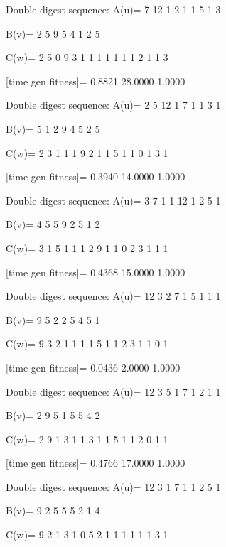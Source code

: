 Double digest sequence:
A(u)=
     7    12     1     2     1     1     5     1     3

B(v)=
     2     5     9     5     4     1     2     5

C(w)=
     2     5     0     9     3     1     1     1     1     1     1     1     2     1     1     3

[time gen fitness]=
    0.8821   28.0000    1.0000

Double digest sequence:
A(u)=
     2     5    12     1     7     1     1     3     1

B(v)=
     5     1     2     9     4     5     2     5

C(w)=
     2     3     1     1     1     9     2     1     1     5     1     1     0     1     3     1

[time gen fitness]=
    0.3940   14.0000    1.0000

Double digest sequence:
A(u)=
     3     7     1     1    12     1     2     5     1

B(v)=
     4     5     5     9     2     5     1     2

C(w)=
     3     1     5     1     1     1     2     9     1     1     0     2     3     1     1     1

[time gen fitness]=
    0.4368   15.0000    1.0000

Double digest sequence:
A(u)=
    12     3     2     7     1     5     1     1     1

B(v)=
     9     5     2     2     5     4     5     1

C(w)=
     9     3     2     1     1     1     1     5     1     1     2     3     1     1     0     1

[time gen fitness]=
    0.0436    2.0000    1.0000

Double digest sequence:
A(u)=
    12     3     5     1     7     1     2     1     1

B(v)=
     2     9     5     1     5     5     4     2

C(w)=
     2     9     1     3     1     1     3     1     1     5     1     1     2     0     1     1

[time gen fitness]=
    0.4766   17.0000    1.0000

Double digest sequence:
A(u)=
    12     3     1     7     1     1     2     5     1

B(v)=
     9     2     5     5     5     2     1     4

C(w)=
     9     2     1     3     1     0     5     2     1     1     1     1     1     1     3     1

